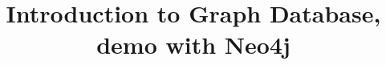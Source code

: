 \documentclass[xcolor=dvipsnames,compress,t,pdf,9pt]{beamer}
\title[\insertframenumber /\inserttotalframenumber]{Introduction to Graph Database, demo with Neo4j}
\begin{document}
	\begin{frame}
	\titlepage
	\end{frame}
	
	
	
\end{document}
